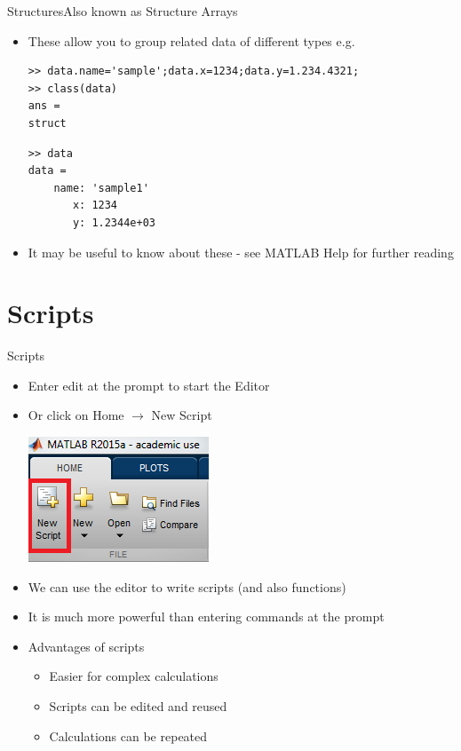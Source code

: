 \documentclass{beamer}
\begin{document}
\begin{frame}[fragile]{Structures}{Also known as Structure Arrays}
	\begin{itemize}
		\item These allow you to group related data of different types e.g.
		
		\begin{lstlisting}[style=Matlab-editor]
>> data.name='sample';data.x=1234;data.y=1.234.4321;
>> class(data)
ans = 
struct
		\end{lstlisting}
		\begin{lstlisting}[style=Matlab-bw]
>> data
data = 
    name: 'sample1'
       x: 1234
       y: 1.2344e+03 
		\end{lstlisting}	
		\item It may be useful to know about these - see MATLAB Help for further reading
	\end{itemize}
\end{frame}

\section{Scripts}
\begin{frame}{Scripts}
	\begin{itemize}
		\item Enter edit at the prompt to start the Editor
		\item Or click on Home $\rightarrow$ New Script
		
		\includegraphics[scale=0.7]{new_script}	
		
		\item We can use the editor to write scripts (and also functions)
		\item It is much more powerful than entering commands at the prompt
		\item Advantages of scripts
			\begin{itemize}
				\item Easier for complex calculations
				\item Scripts can be edited and reused
				\item Calculations can be repeated
			\end{itemize}
	\end{itemize}
\end{frame}
\end{document}
